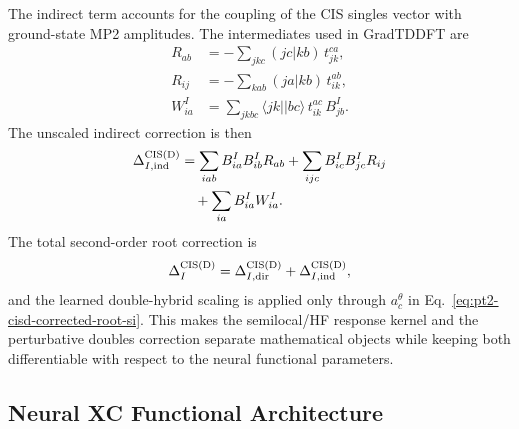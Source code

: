 The indirect term accounts for the coupling of the CIS singles vector
with ground-state MP2 amplitudes. The intermediates used in
GradTDDFT are
\begin{align}
  R_{ab}
  &=
  -\sum_{jkc}
  (jc|kb)\,t_{jk}^{ca},
  \label{eq:cisd-rab-si}
  \\
  R_{ij}
  &=
  -\sum_{kab}
  (ja|kb)\,t_{ik}^{ab},
  \label{eq:cisd-rij-si}
  \\
  W_{ia}^{I}
  &=
  \sum_{jkbc}
  \langle jk||bc\rangle\,
  t_{ik}^{ac}\,
  B_{jb}^{I}.
  \label{eq:cisd-wia-si}
\end{align}
The unscaled indirect correction is then
\begin{equation}
\begin{aligned}
  \Delta_{I,{\rm ind}}^{\rm CIS(D)}
  &=
  \sum_{iab}
  B_{ia}^{I}B_{ib}^{I}R_{ab}
  +
  \sum_{ijc}
  B_{ic}^{I}B_{jc}^{I}R_{ij}  \\
  &\quad+
  \sum_{ia}
  B_{ia}^{I}W_{ia}^{I}.
\end{aligned}
  \label{eq:cisd-indirect-si}
\end{equation}
The total second-order root correction is
\begin{equation}
  \Delta_I^{\rm CIS(D)}
  =
  \Delta_{I,{\rm dir}}^{\rm CIS(D)}
  +
  \Delta_{I,{\rm ind}}^{\rm CIS(D)},
  \label{eq:cisd-total-si}
\end{equation}
and the learned double-hybrid scaling is applied only through
$a_c^\theta$ in Eq.~\eqref{eq:pt2-cisd-corrected-root-si}. This makes
the semilocal/HF response kernel and the perturbative doubles
correction separate mathematical objects while keeping both
differentiable with respect to the neural functional parameters.

\subsection{Neural XC Functional Architecture}
\label{sec:neuralxc}

